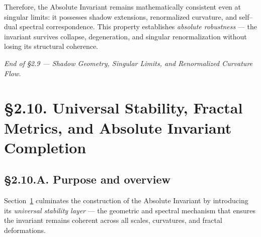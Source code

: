 Therefore, the Absolute Invariant remains mathematically consistent even at singular limits:
it possesses shadow extensions, renormalized curvature, and self–dual spectral correspondence.
This property establishes \emph{absolute robustness} — the invariant survives collapse,
degeneration, and singular renormalization without losing its structural coherence.

\begin{center}
\textit{End of §2.9 — Shadow Geometry, Singular Limits, and Renormalized Curvature Flow.}
\end{center}


\section{§2.10. Universal Stability, Fractal Metrics, and Absolute Invariant Completion}
\label{sec:2.10-fractal}

\subsection*{§2.10.A. Purpose and overview}

Section~\ref{sec:2.10-fractal} culminates the construction of the Absolute Invariant by introducing its
\emph{universal stability layer} — the geometric and spectral mechanism that ensures
the invariant remains coherent across all scales, curvatures, and fractal deformations.

